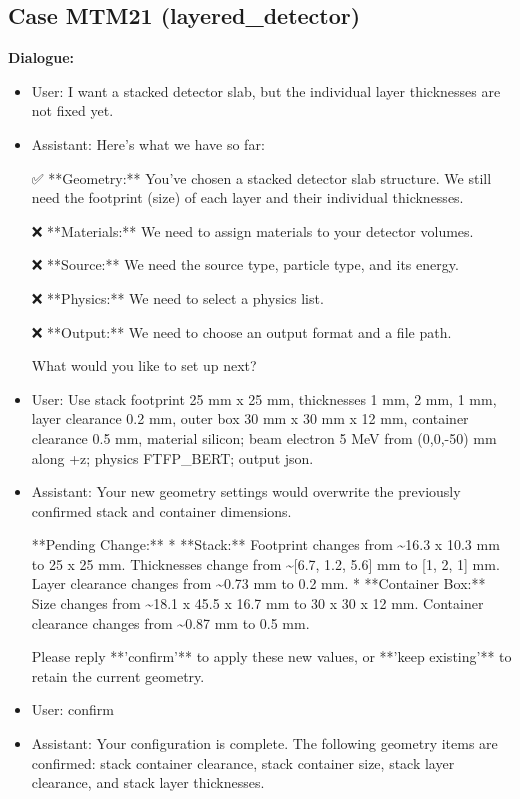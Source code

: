 \documentclass[11pt]{ctexart}
\begin{document}
\subsection{Case MTM21 (layered\_detector)}
\textbf{Dialogue:}
\begin{itemize}
\item User: I want a stacked detector slab, but the individual layer thicknesses are not fixed yet.
\item Assistant: Here's what we have so far:

✅ **Geometry:** You've chosen a stacked detector slab structure. We still need the footprint (size) of each layer and their individual thicknesses.

❌ **Materials:** We need to assign materials to your detector volumes.

❌ **Source:** We need the source type, particle type, and its energy.

❌ **Physics:** We need to select a physics list.

❌ **Output:** We need to choose an output format and a file path.

What would you like to set up next?
\item User: Use stack footprint 25 mm x 25 mm, thicknesses 1 mm, 2 mm, 1 mm, layer clearance 0.2 mm, outer box 30 mm x 30 mm x 12 mm, container clearance 0.5 mm, material silicon; beam electron 5 MeV from (0,0,-50) mm along +z; physics FTFP\_BERT; output json.
\item Assistant: Your new geometry settings would overwrite the previously confirmed stack and container dimensions.

**Pending Change:**
*   **Stack:** Footprint changes from \textasciitilde{}16.3 x 10.3 mm to 25 x 25 mm. Thicknesses change from \textasciitilde{}[6.7, 1.2, 5.6] mm to [1, 2, 1] mm. Layer clearance changes from \textasciitilde{}0.73 mm to 0.2 mm.
*   **Container Box:** Size changes from \textasciitilde{}18.1 x 45.5 x 16.7 mm to 30 x 30 x 12 mm. Container clearance changes from \textasciitilde{}0.87 mm to 0.5 mm.

Please reply **'confirm'** to apply these new values, or **'keep existing'** to retain the current geometry.
\item User: confirm
\item Assistant: Your configuration is complete. The following geometry items are confirmed: stack container clearance, stack container size, stack layer clearance, and stack layer thicknesses.
\end{itemize}
\end{document}
